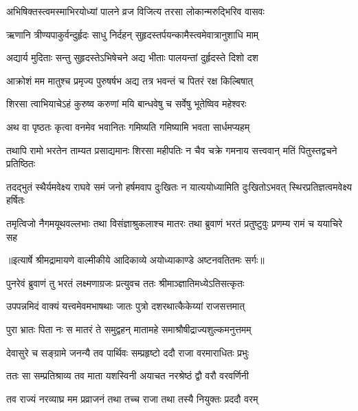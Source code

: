 \twolineshloka
{अभिषिक्तस्त्वमस्माभिरयोध्यां पालने व्रज}
{विजित्य तरसा लोकान्मरुद्भिरिव वासवः} %

\twolineshloka
{ऋणानि त्रीण्यपाकुर्वन्दुर्हृदः साधु निर्दहन्}
{सुहृदस्तर्पयन्कामैस्त्वमेवात्रानुशाधि माम्} %

\twolineshloka
{अद्यार्य मुदिताः सन्तु सुहृदस्तेऽभिषेचने}
{अद्य भीताः पालयन्तां दुर्हृदस्ते दिशो दश} %

\twolineshloka
{आक्रोशं मम मातुश्च प्रमृज्य पुरुषर्षभ}
{अद्य तत्र भवन्तं च पितरं रक्ष किल्बिषात्} %

\twolineshloka
{शिरसा त्वाभियाचेऽहं कुरुष्व करुणां मयि}
{बान्धवेषु च सर्वेषु भूतेष्विव महेश्वरः} %

\twolineshloka
{अथ वा पृष्ठतः कृत्वा वनमेव भवानितः}
{गमिष्यति गमिष्यामि भवता सार्धमप्यहम्} %

\fourlineindentedshloka
{तथापि रामो भरतेन ताम्यत}
{प्रसाद्यमानः शिरसा महीपतिः}
{न चैव चक्रे गमनाय सत्त्ववान्}
{मतिं पितुस्तद्वचने प्रतिष्ठितः} %

\fourlineindentedshloka
{तदद्भुतं स्थैर्यमवेक्ष्य राघवे}
{समं जनो हर्षमवाप दुःखितः}
{न यात्ययोध्यामिति दुःखितोऽभवत्}
{स्थिरप्रतिज्ञत्वमवेक्ष्य हर्षितः} %

\fourlineindentedshloka
{तमृत्विजो नैगमयूथवल्लभाः}
{तथा विसंज्ञाश्रुकलाश्च मातरः}
{तथा ब्रुवाणं भरतं प्रतुष्टुवुः}
{प्रणम्य रामं च ययाचिरे सह} %


{॥इत्यार्षे श्रीमद्रामायणे वाल्मीकीये आदिकाव्ये अयोध्याकाण्डे अष्टनवतितमः सर्गः॥}


\twolineshloka
{पुनरेवं ब्रुवाणं तु भरतं लक्ष्मणाग्रजः}
{प्रत्युवच ततः श्रीमाञ्ज्ञातिमध्येऽतिसत्कृतः} %

\twolineshloka
{उपपन्नमिदं वाक्यं यत्त्वमेवमभाषथाः}
{जातः पुत्रो दशरथात्कैकेय्यां राजसत्तमात्} %

\twolineshloka
{पुरा भ्रातः पिता नः स मातरं ते समुद्वहन्}
{मातामहे समाश्रौषीद्राज्यशुल्कमनुत्तमम्} %

\twolineshloka
{देवासुरे च सङ्ग्रामे जनन्यै तव पार्थिवः}
{सम्प्रहृष्टो ददौ राजा वरमाराधितः प्रभुः} %

\twolineshloka
{ततः सा सम्प्रतिश्राव्य तव माता यशस्विनी}
{अयाचत नरश्रेष्ठं द्वौ वरौ वरवर्णिनी} %

\twolineshloka
{तव राज्यं नरव्याघ्र मम प्रव्राजनं तथा}
{तच्च राजा तथा तस्यै नियुक्तः प्रददौ वरम्} %

